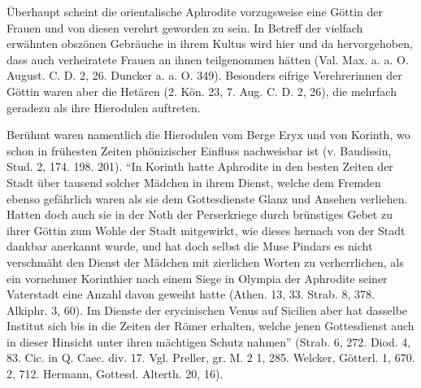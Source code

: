 \documentclass[a4paper, 11pt, oneside]{article}
\begin{document}
Überhaupt scheint die orientalische Aphrodite vorzugsweise eine Göttin der Frauen und von diesen verehrt geworden zu sein. In Betreff der vielfach erwähnten obszönen Gebräuche in ihrem Kultus wird hier und da hervorgehoben, dass auch verheiratete Frauen an ihnen teilgenommen hätten (Val. Max. a. a. O. August. C. D. 2, 26. Duncker a. a. O. 349). Besonders eifrige Verehrerinnen der Göttin waren aber die Hetären (2. Kön. 23, 7. Aug. C. D. 2, 26), die mehrfach geradezu als ihre Hierodulen auftreten.

Berühmt waren namentlich die Hierodulen vom Berge Eryx und von Korinth, wo schon in frühesten Zeiten phönizischer Einfluss nachweisbar ist (v. Baudissin, Stud. 2, 174. 198. 201). "`In Korinth hatte Aphrodite in den besten Zeiten der Stadt über tausend solcher Mädchen in ihrem Dienst, welche dem Fremden ebenso gefährlich waren als sie dem Gottesdienste Glanz und Ansehen verliehen. Hatten doch auch sie in der Noth der Perserkriege durch brünstiges Gebet zu ihrer Göttin zum Wohle der Stadt mitgewirkt, wie dieses hernach von der Stadt dankbar anerkannt wurde, und hat doch selbst die Muse Pindars es nicht verschmäht den Dienst der Mädchen mit zierlichen Worten zu verherrlichen, als ein vornehmer Korinthier nach einem Siege in Olympia der Aphrodite seiner Vaterstadt eine Anzahl davon geweiht hatte (Athen. 13, 33. Strab. 8, 378. Alkiphr. 3, 60). Im Dienste der erycinischen Venus auf Sicilien aber hat dasselbe Institut sich bis in die Zeiten der Römer erhalten, welche jenen Gottesdienst auch in dieser Hinsicht unter ihren mächtigen Schutz nahmen"' (Strab. 6, 272. Diod. 4, 83. Cic. in Q. Caec. div. 17. Vgl. Preller, gr. M. 2 1, 285. Welcker, Götterl. 1, 670. 2, 712. Hermann, Gottesd. Alterth. 20, 16).
\end{document}
